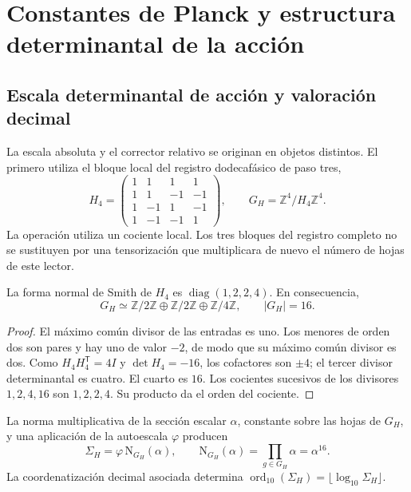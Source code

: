 \section{Constantes de Planck y estructura determinantal de la acción}
\label{v:ant:sec:action}
\subsection{Escala determinantal de acción y valoración decimal}

La escala absoluta y el corrector relativo se originan en objetos
distintos. El primero utiliza el bloque local del registro dodecafásico
de paso tres,
\begin{equation}
 H_4=\begin{pmatrix}
 1&1&1&1\\1&1&-1&-1\\1&-1&1&-1\\1&-1&-1&1
 \end{pmatrix},\qquad
 G_H=\mathbb Z^4/H_4\mathbb Z^4.
 \label{v:ant:eq:el-h4}
\end{equation}
La operación utiliza un cociente local. Los tres bloques del registro
completo no se sustituyen por una tensorización que multiplicara de
nuevo el número de hojas de este lector.

\begin{lemma}
La forma normal de Smith de \(H_4\) es
\(\operatorname{diag}(1,2,2,4)\). En consecuencia,
\[
 G_H\simeq\mathbb Z/2\mathbb Z\oplus\mathbb Z/2\mathbb Z
 \oplus\mathbb Z/4\mathbb Z,\qquad |G_H|=16.
\]
\end{lemma}
\begin{proof}
El máximo común divisor de las entradas es uno. Los menores de orden dos
son pares y hay uno de valor \(-2\), de modo que su máximo común divisor
es dos. Como \(H_4H_4^{\mathsf T}=4I\) y \(\det H_4=-16\), los
cofactores son \(\pm4\); el tercer divisor determinantal es cuatro.
El cuarto es \(16\). Los cocientes sucesivos de los divisores
\(1,2,4,16\) son \(1,2,2,4\). Su producto da el orden del cociente.
\end{proof}

\begin{definition}
La norma multiplicativa de la sección escalar \(\alpha\), constante
sobre las hojas de \(G_H\), y una aplicación de la autoescala
\(\varphi\) producen
\begin{equation}
 \Sigma_H=\varphi\,\mathrm N_{G_H}(\alpha),\qquad
 \mathrm N_{G_H}(\alpha)=\prod_{g\in G_H}\alpha=\alpha^{16}.
 \label{v:ant:eq:el-lector-determinantal}
\end{equation}
La coordenatización decimal asociada determina
\(\operatorname{ord}_{10}(\Sigma_H)=\lfloor\log_{10}\Sigma_H\rfloor\).
\end{definition}

